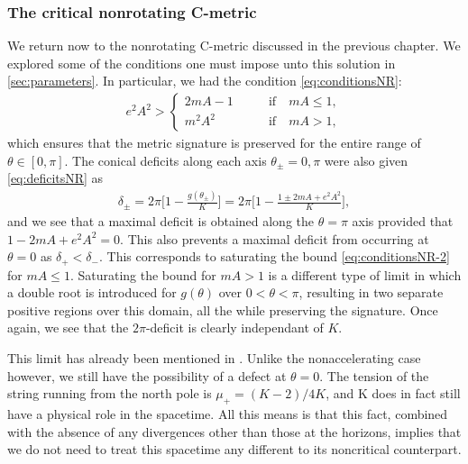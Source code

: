 \documentclass[
twoside,
openright,
frontopenright,
]{dmathesis}
\begin{document}
\subsubsection{The critical nonrotating C-metric}
\label{sec:critnrC}

We return now to the nonrotating C-metric discussed in the previous chapter. We
explored some of the conditions one must impose unto this solution in
\cref{sec:parameters}. In particular, we had the condition
\eqref{eq:conditionsNR}:
\begin{align}
  \label{eq:conditionsNR-2}
  e^2A^2 >
  \begin{cases}
    2mA - 1 \qquad &\mbox{if} \quad mA \leqslant 1,\\
    m^2A^2 \qquad &\mbox{if} \quad mA > 1,
  \end{cases}
\end{align}
which ensures that the metric signature is preserved for the entire range of
$\theta\in [0,\pi]$. The conical deficits along each axis $\theta_\pm = 0,\pi$
were also given \eqref{eq:deficitsNR} as
\begin{align}
  \label{eq:deficitsNR-2}
  \delta_\pm=2\pi\bigg[1-\frac{g(\theta_\pm)}{K}\bigg] = 2\pi\bigg[1-\frac{1\pm
  2mA + e^2A^2}{K}\bigg],
\end{align}
and we see that a maximal deficit is obtained along the $\theta = \pi$ axis
provided that $1-2mA + e^2 A^2 = 0$. This also prevents a maximal deficit from
occurring at $\theta = 0$ as $\delta_+<\delta_-$. This corresponds to saturating
the bound \eqref{eq:conditionsNR-2} for $mA \leqslant 1$. Saturating the bound
for $mA > 1$ is a different type of limit in which a double root is introduced
for $g(\theta)$ over $0<\theta<\pi$, resulting in two separate positive regions
over this domain, all the while preserving the signature. Once again, we see
that the $2\pi$-deficit is clearly independant of $K$.

This limit has already been mentioned in
\cite{Chen:2015vma,Hubeny:2009ru}. Unlike the nonaccelerating case however, we
still have the possibility of a defect at $\theta = 0$. The tension of the
string running from the north pole is $\mu_+ = (K-2)/4K$, and K does in fact
still have a physical role in the spacetime. All this means is that this fact,
combined with the absence of any divergences other than those at the horizons,
implies that we do not need to treat this spacetime any different to its
noncritical counterpart.
\end{document}
